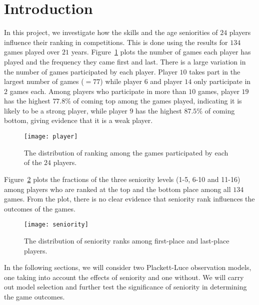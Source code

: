 \section{Introduction}
In this project, we investigate how the skills and the age seniorities of $24$ players influence their ranking in competitions. This is done using the results for $134$ games played over $21$ years. Figure~\ref{fig:1} plots the number of games each player has played and the frequency they came first and last. There is a large variation in the number of games participated by each player. Player $10$ takes part in the largest number of games ($=77$) while player $6$ and player $14$ only participate in $2$ games each. Among players who participate in more than $10$ games, player $19$ has the highest $77.8\%$ of coming top among the games played, indicating it is likely to be a strong player, while player $9$ has the highest $87.5\%$ of coming bottom, giving evidence that it is a weak player.
\begin{figure}[ht!]
\centering
\texttt{[image: player]}
\caption{The distribution of ranking among the games participated by each of the $24$ players.}
\label{fig:1}
\end{figure}

Figure~\ref{fig:2} plots the fractions of the three seniority levels (1-5, 6-10 and 11-16) among players who are ranked at the top and the bottom place among all $134$ games. From the plot, there is no clear evidence that seniority rank influences the outcomes of the games.
\begin{figure}[ht!]
\centering
\texttt{[image: seniority]}
\caption{The distribution of seniority ranks among first-place and last-place players.}
\label{fig:2}
\end{figure}

In the following sections, we will consider two Plackett-Luce observation models, one taking into account the effects of seniority and one without. We will carry out model selection and further test the significance of seniority in determining the game outcomes.
